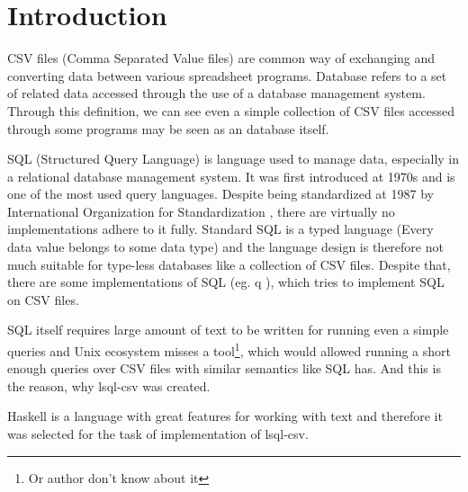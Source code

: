 \chapter*{Introduction}

CSV files (Comma Separated Value files) are common way of exchanging and converting data between various spreadsheet programs. \cite{rfc4180} 
Database refers to a set of related data accessed through the use of a database management system. \cite{enwiki-database} 
Through this definition, we can see even a simple collection of CSV files accessed through some programs may be seen as an database itself.


SQL (Structured Query Language) is language used to manage data, especially in a relational database management system. \cite{enwiki-sql} 
It was first introduced at 1970s \cite{enwiki-sql} and is one of the most used query languages. 
Despite being standardized at 1987 by International Organization for Standardization \cite{ISO9075-1987}, 
there are virtually no implementations adhere to it fully. \cite{enwiki-sql}
Standard SQL is a typed language (Every data value belongs to some data type) \cite{ISO9075-2023} and the language
design is therefore not much suitable for type-less databases like a collection of CSV files.
Despite that, there are some implementations of SQL (eg. q \cite{q}), which tries to implement SQL on CSV files.

SQL itself requires large amount of text to be written for running even a simple queries and Unix ecosystem misses a tool\footnote{Or author don't know about it}, 
which would allowed running a short enough queries over CSV files with similar semantics like SQL has. And this is the reason, why lsql-csv was created.

Haskell is a language with great features for working with text \cite{practical-haskell} and therefore it was selected for the task of implementation of lsql-csv.

